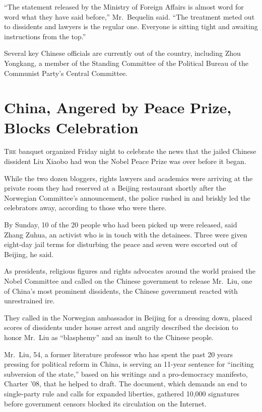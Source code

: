 ﻿\documentclass[12pt]{article}
\begin{document}
``The statement released by the Ministry of Foreign Affairs is almost word for word what they have
said before,'' Mr.~Bequelin said. ``The treatment meted out to dissidents and lawyers is the regular
one. Everyone is sitting tight and awaiting instructions from the top.''

Several key Chinese officials are currently out of the country, including Zhou Yongkang, a member of
the Standing Committee of the Political Bureau of the Communist Party's Central Committee.

\section{China, Angered by Peace Prize, Blocks Celebration}

\lettrine{T}{he} banquet organized Friday night to celebrate the news that
the jailed Chinese dissident Liu Xiaobo had won the Nobel Peace Prize was over before it began.

While the two dozen bloggers, rights lawyers and academics were arriving at the private room they
had reserved at a Beijing restaurant shortly after the Norwegian Committee's announcement, the
police rushed in and briskly led the celebrators away, according to those who were there.

By Sunday, 10 of the 20 people who had been picked up were released, said Zhang Zuhua, an activist
who is in touch with the detainees. Three were given eight-day jail terms for disturbing the peace
and seven were escorted out of Beijing, he said.

As presidents, religious figures and rights advocates around the world praised the Nobel Committee
and called on the Chinese government to release Mr.~Liu, one of China's most prominent dissidents,
the Chinese government reacted with unrestrained ire.

They called in the Norwegian ambassador in Beijing for a dressing down, placed scores of dissidents
under house arrest and angrily described the decision to honor Mr.~Liu as ``blasphemy'' and an
insult to the Chinese people.

Mr.~Liu, 54, a former literature professor who has spent the past 20 years pressing for political
reform in China, is serving an 11-year sentence for ``inciting subversion of the state,'' based on
his writings and a pro-democracy manifesto, Charter '08, that he helped to draft. The document,
which demands an end to single-party rule and calls for expanded liberties, gathered 10,000
signatures before government censors blocked its circulation on the Internet.
\end{document}
